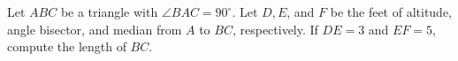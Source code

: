 Let $A B C$ be a triangle with $\angle B A C=90^{\circ}$. Let $D, E$, and $F$ be the feet of altitude, angle bisector, and median from $A$ to $B C$, respectively. If $D E=3$ and $E F=5$, compute the length of $B C$.